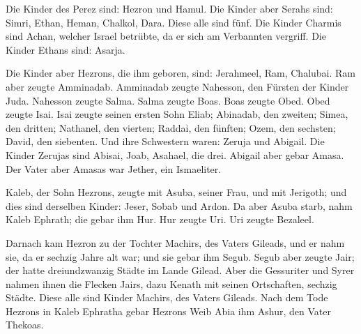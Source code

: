  Die Kinder des Perez sind: Hezron und Hamul. 
Die Kinder aber Serahs sind: Simri, Ethan, Heman, Chalkol, Dara. Diese
alle sind fünf.  Die Kinder Charmis sind Achan, welcher
Israel betrübte, da er sich am Verbannten vergriff.  Die
Kinder Ethans sind: Asarja.

 Die Kinder aber Hezrons, die ihm geboren, sind: Jerahmeel,
Ram, Chalubai.  Ram aber zeugte Amminadab. Amminadab zeugte
Nahesson, den Fürsten der Kinder Juda.  Nahesson zeugte
Salma. Salma zeugte Boas.  Boas zeugte Obed. Obed zeugte
Isai.  Isai zeugte seinen ersten Sohn Eliab; Abinadab, den
zweiten; Simea, den dritten;  Nathanel, den vierten;
Raddai, den fünften;  Ozem, den sechsten; David, den
siebenten.  Und ihre Schwestern waren: Zeruja und Abigail.
Die Kinder Zerujas sind Abisai, Joab, Asahael, die drei. 
Abigail aber gebar Amasa. Der Vater aber Amasas war Jether, ein
Ismaeliter.

 Kaleb, der Sohn Hezrons, zeugte mit Asuba, seiner Frau,
und mit Jerigoth; und dies sind derselben Kinder: Jeser, Sobab und
Ardon.  Da aber Asuba starb, nahm Kaleb Ephrath; die gebar
ihm Hur.  Hur zeugte Uri. Uri zeugte Bezaleel.

 Darnach kam Hezron zu der Tochter Machirs, des Vaters
Gileads, und er nahm sie, da er sechzig Jahre alt war; und sie gebar ihm
Segub.  Segub aber zeugte Jair; der hatte dreiundzwanzig
Städte im Lande Gilead.  Aber die Gessuriter und Syrer
nahmen ihnen die Flecken Jairs, dazu Kenath mit seinen Ortschaften,
sechzig Städte. Diese alle sind Kinder Machirs, des Vaters Gileads.
 Nach dem Tode Hezrons in Kaleb Ephratha gebar Hezrons Weib
Abia ihm Ashur, den Vater Thekoas.

